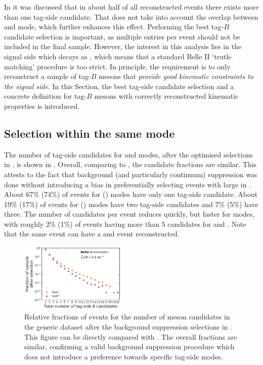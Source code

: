 In  it was discussed that in about half of all reconstructed events there exists more than one tag-side candidate.
That does not take into account the overlap between \feiBp and \feiBz mode, which further enhances this effect.
Performing the best tag-$B$ candidate selection is important, as multiple entries per event should not be included in the final sample.
However, the interest in this analysis lies in the signal side which decays as \BtoXsgamma, which means that a standard Belle II `truth-matching' procedure is too strict.
In principle, the requirement is to only reconstruct a sample of tag-$B$ mesons that \textit{provide good kinematic constraints to the signal side}.
In this Section, the best tag-side candidate selection and
a concrete definition for tag-$B$ mesons with correctly reconstructed kinematic properties is introduced.

\subsection{Selection within the same \texorpdfstring{\FEI}{FEI} mode}\label{sec:select_tag_between_modes}

The number of tag-side candidates for \feiBp and \feiBz modes, after the optimised selections in ,
is shown in .
Overall, comparing to , the candidate fractions are similar.
This attests to the fact that background (and particularly continuum) suppression was done without introducing a bias in preferentially selecting events with large \feiProb in .
About 67\% (74\%) of events for \feiBp (\feiBz) modes have only one tag-side candidate.
About 19\% (17\%) of events for \feiBp (\feiBz) modes have two tag-side candidates and 7\% (5\%) have three.
The number of candidates per event reduces quickly, but faster for \Bz modes, 
with roughly 2\% (1\%) of events having more than 5 candidates for \Bp and \Bz.
Note that the same event can have a \Bp and \Bz event reconstructed.

\begin{figure}[htbp!]
    \centering
    \includegraphics[width=0.45\textwidth]{figures/best_tag_selection/Bboth_total_tag_candidates_post_optimisation.pdf}
    \caption{\label{fig:fei_tag_reco_candidates_post_optimisation} 
    Relative fractions of events for the number of \B meson candidates in the generic \MC dataset after the background suppression selections in .
    This figure can be directly compared with .
    The overall fractions are similar, confirming a valid background suppression procedure which does not introduce a preference towards specific tag-side modes.
    }
\end{figure}

